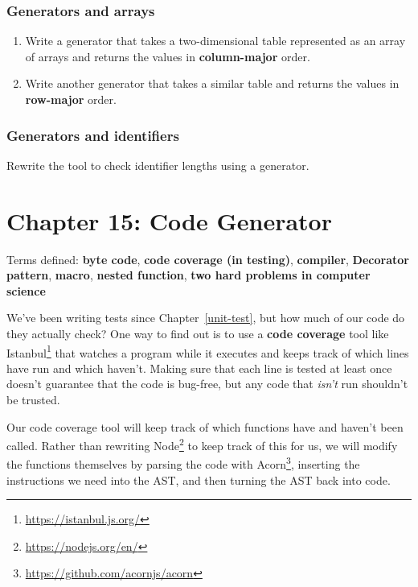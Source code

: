 \documentclass[krantzl]{krantz}
\newcommand{\chapref}[1]{Chapter~\ref{#1}}
\newcommand{\glossref}[1]{\textbf{#1}}
\newcommand{\hreffoot}[2]{{#1}\footnote{\href{#2}{#2}}}
\begin{document}
\subsection*{Generators and arrays}

\begin{enumerate}

\item 

Write a generator that takes a two-dimensional table represented as an array of arrays
    and returns the values in \glossref{column-major} order.



\item 

Write another generator that takes a similar table
    and returns the values in \glossref{row-major} order.



\end{enumerate}

\subsection*{Generators and identifiers}


Rewrite the tool to check identifier lengths using a generator.

\chapter{Chapter 15: Code Generator}\label{code-generator}


\noindent 
    Terms defined:
    \glossref{byte code}, \glossref{code coverage (in testing)}, \glossref{compiler}, \glossref{Decorator pattern}, \glossref{macro}, \glossref{nested function}, \glossref{two hard problems in computer science}



We've been writing tests since \chapref{unit-test},
but how much of our code do they actually check?
One way to find out is to use a \glossref{code coverage} tool
like \hreffoot{Istanbul}{https://istanbul.js.org/}
that watches a program while it executes
and keeps track of which lines have run and which haven't.
Making sure that each line is tested at least once doesn't guarantee that the code is bug-free,
but any code that \emph{isn't} run shouldn't be trusted.


Our code coverage tool will keep track of which functions have and haven't been called.
Rather than rewriting \hreffoot{Node}{https://nodejs.org/en/} to keep track of this for us,
we will modify the functions themselves
by parsing the code with \hreffoot{Acorn}{https://github.com/acornjs/acorn},
inserting the instructions we need into the AST,
and then turning the AST back into code.
\end{document}
